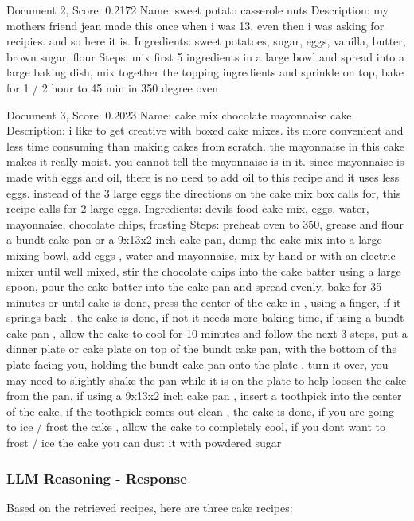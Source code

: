 \documentclass[a4paper,11pt]{article}
\begin{document}
Document 2, Score: 0.2172
Name: sweet potato casserole nuts
Description: my mothers friend jean made this once when i was 13. even then i was asking for recipies. and so here it is.
Ingredients: sweet potatoes, sugar, eggs, vanilla, butter, brown sugar, flour
Steps: mix first 5 ingredients in a large bowl and spread into a large baking dish, mix together the topping ingredients and sprinkle on top, bake for 1 / 2 hour to 45 min in 350 degree oven

Document 3, Score: 0.2023
Name: cake mix chocolate mayonnaise cake
Description: i like to get creative with boxed cake mixes. its more convenient and less time consuming than making cakes from scratch. the mayonnaise in this cake makes it really moist. you cannot tell the mayonnaise is in it. since mayonnaise is made with eggs and oil, there is no need to add oil to this recipe and it uses less eggs. instead of the 3 large eggs the directions on the cake mix box calls for, this recipe calls for 2 large eggs.
Ingredients: devils food cake mix, eggs, water, mayonnaise, chocolate chips, frosting
Steps: preheat oven to 350, grease and flour a bundt cake pan or a 9x13x2 inch cake pan, dump the cake mix into a large mixing bowl, add eggs , water and mayonnaise, mix by hand or with an electric mixer until well mixed, stir the chocolate chips into the cake batter using a large spoon, pour the cake batter into the cake pan and spread evenly, bake for 35 minutes or until cake is done, press the center of the cake in , using a finger, if it springs back , the cake is done, if not it needs more baking time, if using a bundt cake pan , allow the cake to cool for 10 minutes and follow the next 3 steps, put a dinner plate or cake plate on top of the bundt cake pan, with the bottom of the plate facing you, holding the bundt cake pan onto the plate , turn it over, you may need to slightly shake the pan while it is on the plate to help loosen the cake from the pan, if using a 9x13x2 inch cake pan , insert a toothpick into the center of the cake, if the toothpick comes out clean , the cake is done, if you are going to ice / frost the cake , allow the cake to completely cool, if you dont want to frost / ice the cake you can dust it with powdered sugar




\subsubsection{LLM Reasoning - Response}
Based on the retrieved recipes, here are three cake recipes:
\end{document}

